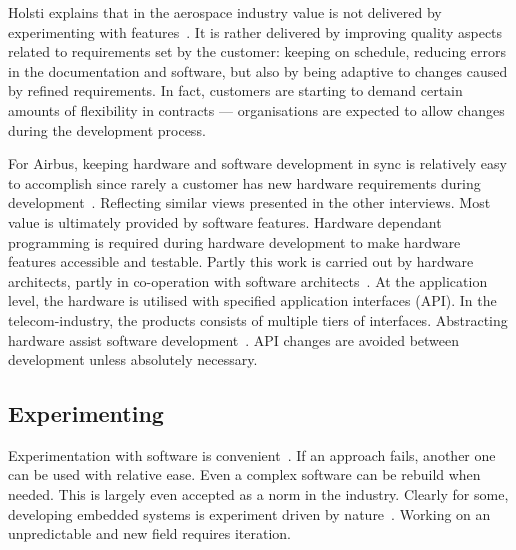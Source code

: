 \documentclass[english]{tktltiki2}
\begin{document}
Holsti explains that in the aerospace industry value is not delivered by experimenting with features~\cite{Hol15b}. It is rather delivered by improving quality aspects related to requirements set by the customer: keeping on schedule, reducing errors in the documentation and software, but also by being adaptive to changes caused by refined requirements. In fact, customers are starting to demand certain amounts of flexibility in contracts — organisations are expected to allow changes during the development process.

For Airbus, keeping hardware and software development in sync is relatively easy to accomplish since rarely a customer has new hardware requirements during development~\cite{Koi15}. Reflecting similar views presented in the other interviews. Most value is ultimately provided by software features. Hardware dependant programming is required during hardware development to make hardware features accessible and testable. Partly this work is carried out by hardware architects, partly in co-operation with software architects~\cite{Koi15}. At the application level, the hardware is utilised with specified application interfaces (API). In the telecom-industry, the products consists of multiple tiers of interfaces. Abstracting hardware assist software development~\cite{Koi15}. API changes are avoided between development unless absolutely necessary.

\subsection{Experimenting}

Experimentation with software is convenient~\cite{Hol15a}. If an approach fails, another one can be used with relative ease. Even a complex software can be rebuild when needed. This is largely even accepted as a norm in the industry. Clearly for some, developing embedded systems is experiment driven by nature~\cite{Hol15a, Kri15}. Working on an unpredictable and new field requires iteration.
\end{document}
